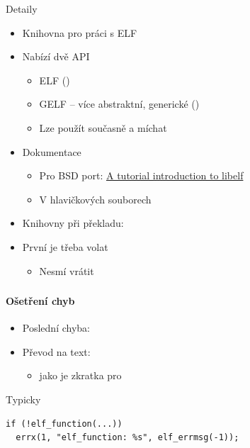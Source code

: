 \begin{frame}{}{Detaily}

  \begin{itemize}
    \item Knihovna pro práci s ELF
    \item Nabízí dvě API
    \begin{itemize}
      \item ELF ()
      \item GELF -- více abstraktní, generické ()
      \item Lze použít současně a míchat
    \end{itemize}

    \pause

    \item Dokumentace
    \begin{itemize}
      \item Pro BSD port: \href{http://sourceforge.net/projects/elftoolchain/files/Documentation/libelf-by-example/20120308/libelf-by-example.pdf/download}{A tutorial introduction to libelf}
      \item V hlavičkových souborech
    \end{itemize}

    \pause

    \item Knihovny při překladu: 
    \item První je třeba volat 
    \begin{itemize}
      \item Nesmí vrátit 
    \end{itemize}
  \end{itemize}

\end{frame}

\begin{frame}[fragile]
  \frametitle{}
  \framesubtitle{Ošetření chyb}

  \begin{itemize}
    \item Poslední chyba: 
    \item Převod na text: 
    \begin{itemize}
      \item {} jako  je zkratka pro 
    \end{itemize}
  \end{itemize}

  \begin{block}{Typicky}
  \begin{lstlisting}
if (!elf_function(...))
  errx(1, "elf_function: %s", elf_errmsg(-1));
  \end{lstlisting} %
  \end{block}

\end{frame}

